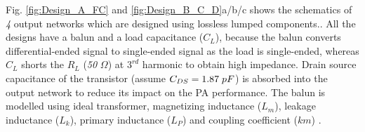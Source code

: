 \documentclass[conference]{IEEEtran}
\begin{document}
Fig. \ref{fig:Design_A_FC} and \ref{fig:Design_B_C_D}a/b/c shows the schematics of \textit{4} output networks which are designed using lossless lumped components.. 
All the designs have a balun and a load capacitance ($C_L$), because the balun converts differential-ended signal to single-ended signal as the load is single-ended, whereas $C_L$ shorts the $R_L$ (\textit{50} $\Omega$) at $3^{rd}$ harmonic to obtain high impedance. Drain source capacitance of the transistor (assume $C_{DS}=1.87\hspace{1mm}pF$) is absorbed into the output network to reduce its impact on the PA performance. The balun is modelled using ideal transformer, magnetizing inductance ($L_m$), leakage inductance ($L_k$), primary inductance ($L_P$) and coupling coefficient ($km$) \cite{Transformer_model}. 
\end{document}
